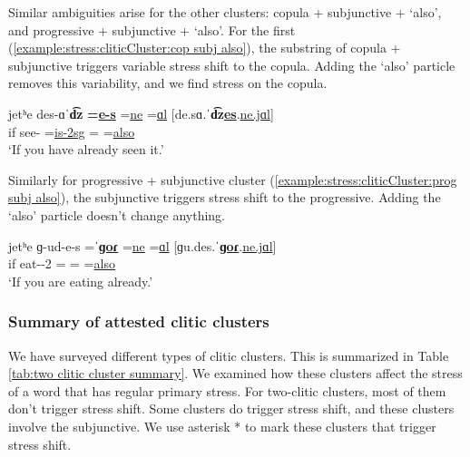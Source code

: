 Similar ambiguities arise for the other clusters: copula + subjunctive + `also', and progressive + subjunctive + `also'. For the first (\ref{example:stress:cliticCluster:cop subj also}), the substring of copula + subjunctive   triggers variable stress shift to the copula. Adding the `also' particle removes this variability, and we find stress on the copula.  

\begin{exe}
	\ex \gll    jetʰe des-ɑˈ\textbf{d͡z} \textbf{=\underline{e-s}} =\underline{ne} =\underline{ɑl}  [de.sɑ.ˈ\textbf{d͡z\underline{es}}.\underline{ne.jɑl}]
	\\
	if see-{\rptcp} =\underline{is-2sg} =\underline{{\sbjv}} =\underline{also}
	\\
	\trans `If you have already seen it.'
	\label{example:stress:cliticCluster:cop subj also}
	\\
\end{exe}

Similarly for progressive + subjunctive cluster (\ref{example:stress:cliticCluster:prog subj also}), the subjunctive triggers stress shift to the progressive. Adding the `also' particle doesn't change anything. 

\begin{exe} 
	\ex \gll   
	jetʰe ɡ-ud-e-s   =ˈ\underline{\textbf{ɡoɾ}} =\underline{ne} =\underline{ɑl}  [ɡu.des.ˈ\textbf{\underline{ɡoɾ}}.\underline{ne.jɑl}]
	\\
	if eat-{\thgloss}-2{\sg} =\underline{{\prog}} =\underline{{\sbjv}} =\underline{also}
	\\
	\trans `If you are eating already.'
	\label{example:stress:cliticCluster:prog subj also}
	\\
\end{exe}

\subsubsection{Summary of attested clitic clusters}\label{section:stress:cliticc:cluster:summary}

We have surveyed different types of clitic clusters. This is summarized in Table \ref{tab:two clitic cluster summary}.  We examined how these clusters affect the stress of a word that has regular primary stress.  For two-clitic clusters, most of them don't trigger stress shift. Some clusters do trigger stress shift, and these clusters involve the subjunctive. We use asterisk * to mark these clusters that trigger stress shift. 

